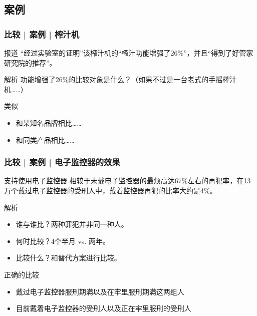 \subsection{案例}
\begin{frame}
  \frametitle{比较 | 案例 | 榨汁机}
  \begin{block}{报道}
    “经过实验室的证明”该榨汁机的“榨汁功能增强了26\%”，并且“得到了好管家研究院的推荐”。
  \end{block}
  \pause
  \begin{block}{解析}
    功能增强了26\%的比较对象是什么？（如果不过是一台老式的手摇榨汁机……）
  \end{block}
  \pause
  \begin{block}{类似}
    \begin{itemize}
      \item 和某知名品牌相比……
      \item 和同类产品相比……
    \end{itemize}
  \end{block}
\end{frame}

\begin{frame}
  \frametitle{比较 | 案例 | 电子监控器的效果}
  \begin{block}{支持使用电子监控器}
    相较于未戴电子监控器的最烦高达67\%左右的再犯率，在13万个戴过电子监控器的受刑人中，戴着监控器再犯的比率大约是4\%。
  \end{block}
  \pause
  \begin{block}{解析}
    \begin{itemize}
      \item 谁与谁比？两种罪犯并非同一种人。
      \item 何时比较？4个半月 vs. 两年。
      \item 比较什么？和替代方案进行比较。
    \end{itemize}
  \end{block}
  \pause
  \begin{block}{正确的比较}
    \begin{itemize}
      \item 戴过电子监控器服刑期满以及在牢里服刑期满这两组人
      \item 目前戴着电子监控器的受刑人以及正在牢里服刑的受刑人
    \end{itemize}
  \end{block}
\end{frame}

